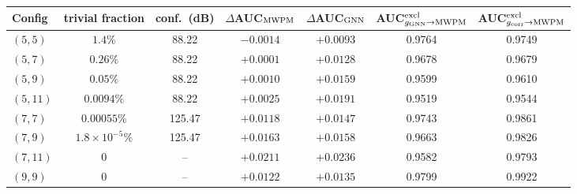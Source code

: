 \begin{tabular}{l|cc|cc|cc}
\toprule
Config & trivial fraction & conf.\ (dB) & $\Delta$AUC$_{\rm MWPM}$ & $\Delta$AUC$_{\rm GNN}$ & AUC$^{\rm excl}_{g_{\rm GNN}\to{\rm MWPM}}$ & AUC$^{\rm excl}_{g_{\rm corr}\to{\rm MWPM}}$ \\
\hline
\midrule
$(5, 5)$ & $1.4\%$ & 88.22 & $-0.0014$ & $+0.0093$ & 0.9764 & 0.9749 \\
$(5, 7)$ & $0.26\%$ & 88.22 & $+0.0001$ & $+0.0128$ & 0.9678 & 0.9679 \\
$(5, 9)$ & $0.05\%$ & 88.22 & $+0.0010$ & $+0.0159$ & 0.9599 & 0.9610 \\
$(5, 11)$ & $0.0094\%$ & 88.22 & $+0.0025$ & $+0.0191$ & 0.9519 & 0.9544 \\
$(7, 7)$ & $0.00055\%$ & 125.47 & $+0.0118$ & $+0.0147$ & 0.9743 & 0.9861 \\
$(7, 9)$ & $1.8 \times 10^{-5}\%$ & 125.47 & $+0.0163$ & $+0.0158$ & 0.9663 & 0.9826 \\
$(7, 11)$ & $0$ & -- & $+0.0211$ & $+0.0236$ & 0.9582 & 0.9793 \\
$(9, 9)$ & $0$ & -- & $+0.0122$ & $+0.0135$ & 0.9799 & 0.9922 \\
\bottomrule
\end{tabular}
